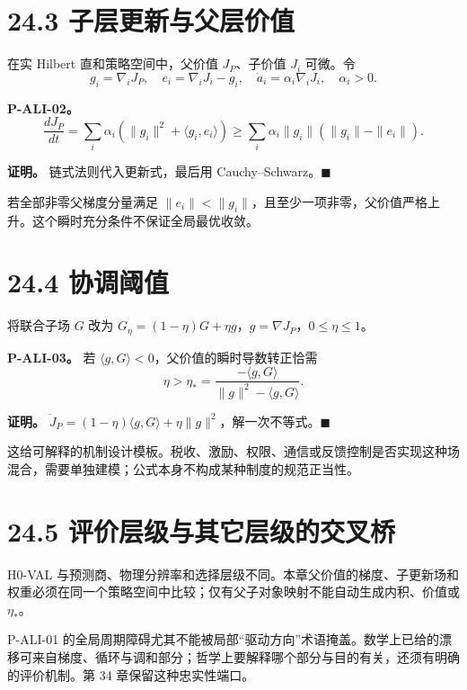 \documentclass[
  11pt,
  oneside]{book}
\begin{document}
\section{24.3 子层更新与父层价值}\label{ux5b50ux5c42ux66f4ux65b0ux4e0eux7236ux5c42ux4ef7ux503c}

在实 Hilbert 直和策略空间中，父价值 \(J_P\)、子价值 \(J_i\) 可微。令 \[g_i=\nabla_iJ_P,\quad
e_i=\nabla_iJ_i-g_i,\quad
\dot a_i=\alpha_i\nabla_iJ_i,\quad\alpha_i>0.\]

\hypertarget{p-ali-02}{}\label{p-ali-02}

\textbf{P-ALI-02。} \[\frac{dJ_P}{dt}
=\sum_i\alpha_i(\|g_i\|^2+\langle g_i,e_i\rangle)
\ge\sum_i\alpha_i\|g_i\|(\|g_i\|-\|e_i\|).\]

\textbf{证明。} 链式法则代入更新式，最后用 Cauchy--Schwarz。\(\blacksquare\)

若全部非零父梯度分量满足 \(\|e_i\|<\|g_i\|\)，且至少一项非零，父价值严格上升。这个瞬时充分条件不保证全局最优收敛。

\section{24.4 协调阈值}\label{ux534fux8c03ux9608ux503c}

将联合子场 \(G\) 改为 \(G_\eta=(1-\eta)G+\eta g\)，\(g=\nabla J_P\)，\(0\le\eta\le1\)。

\hypertarget{p-ali-03}{}\label{p-ali-03}

\textbf{P-ALI-03。} 若 \(\langle g,G\rangle<0\)，父价值的瞬时导数转正恰需 \[\eta>
\eta_*=\frac{-\langle g,G\rangle}
{\|g\|^2-\langle g,G\rangle}.\]

\textbf{证明。} \(\dot J_P=(1-\eta)\langle g,G\rangle+\eta\|g\|^2\)，解一次不等式。\(\blacksquare\)

这给可解释的机制设计模板。税收、激励、权限、通信或反馈控制是否实现这种场混合，需要单独建模；公式本身不构成某种制度的规范正当性。

\section{24.5 评价层级与其它层级的交叉桥}\label{ux8bc4ux4ef7ux5c42ux7ea7ux4e0eux5176ux5b83ux5c42ux7ea7ux7684ux4ea4ux53c9ux6865}

H0-VAL 与预测商、物理分辨率和选择层级不同。本章父价值的梯度、子更新场和权重必须在同一个策略空间中比较；仅有父子对象映射不能自动生成内积、价值或 \(\eta_*\)。

P-ALI-01 的全局周期障碍尤其不能被局部``驱动方向''术语掩盖。数学上已给的漂移可来自梯度、循环与调和部分；哲学上要解释哪个部分与目的有关，还须有明确的评价机制。第 34 章保留这种忠实性端口。
\end{document}

